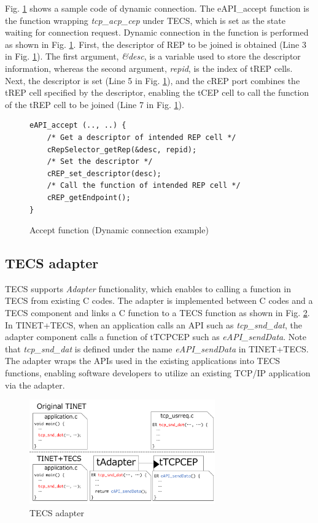 \documentclass[conference]{IEEEtran/IEEEtran}
\begin{document}
Fig. \ref{src:DynamicCcode} shows a sample code of dynamic connection.
The eAPI\_accept function is the function wrapping {\it tcp\_acp\_cep} under TECS, which is set as the state waiting for connection request.
Dynamic connection in the function is performed as shown in Fig. \ref{src:DynamicCcode}.
First, the descriptor of REP to be joined is obtained (Line 3 in Fig. \ref{src:DynamicCcode}).
The first argument, {\it \&desc}, is a variable used to store the descriptor information, whereas the second argument, {\it repid}, is the index of tREP cells.
Next, the descriptor is set (Line 5 in Fig. \ref{src:DynamicCcode}), and the cREP port combines the tREP cell specified by the descriptor, enabling the tCEP cell to call the function of the tREP cell to be joined (Line 7 in Fig. \ref{src:DynamicCcode}).

\begin{figure}[t]
\centering
\begin{lstlisting}
eAPI_accept (.., ..) {
    /* Get a descriptor of intended REP cell */
    cRepSelector_getRep(&desc, repid);
    /* Set the descriptor */
    cREP_set_descriptor(desc);
    /* Call the function of intended REP cell */
    cREP_getEndpoint();
}
\end{lstlisting}
\vspace{-1mm} \caption{Accept function (Dynamic connection example)}
\vspace{-1mm} \label{src:DynamicCcode}
\end{figure}

\subsection{TECS adapter}
\label{sec:TECSAdapter}

TECS supports {\it Adapter} functionality, which enables to calling a function in TECS from existing C codes.
The adapter is implemented between C codes and a TECS component and links a C function to a TECS function as shown in Fig. \ref{fig:TECS_Adapter}.
In TINET+TECS, when an application calls an API such as {\it tcp\_snd\_dat}, the adapter component calls a function of tTCPCEP such as {\it eAPI\_sendData}.
Note that {\it tcp\_snd\_dat} is defined under the name {\it eAPI\_sendData} in TINET+TECS.
The adapter wraps the APIs used in the existing applications into TECS functions, enabling software developers to utilize an existing TCP/IP application via the adapter.

\begin{figure}[t]
    \centering
    \includegraphics[width=8.0cm,clip]{figure/TECS_Adapter.pdf}
    \vspace{-1mm} \caption{TECS adapter}
    \vspace{-1mm} \label{fig:TECS_Adapter}
\end{figure}
\end{document}
